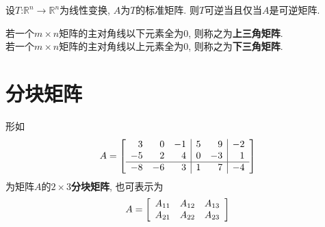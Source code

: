 \begin{TheoremOne}
设$T$:$\mathbb{R}^n\rightarrow\mathbb{R}^n$为线性变换, $A$为$T$的标准矩阵. 则$T$可逆当且仅当$A$是可逆矩阵.
\end{TheoremOne}\vspace{4ex}

若一个$m\times n$矩阵的主对角线以下元素全为0, 则称之为\textbf{上三角矩阵}.\\[1ex]
若一个$m\times n$矩阵的主对角线以上元素全为0, 则称之为\textbf{下三角矩阵}.\\[4ex]

\section{分块矩阵}
形如
\[A=\left[
\begin{array}{r r r|r r|r}
3 & 0 & -1 & 5 & 9 & -2\\
-5 & 2 & 4 & 0 & -3 & 1\\\hline
-8 & -6 & 3 & 1 & 7 & -4
\end{array}
\right]\]
为矩阵$A$的$2\times 3$\textbf{分块矩阵}, 也可表示为
\[A=\left[
\begin{array}{l l l}
A_{11} & A_{12} & A_{13}\\
A_{21} & A_{22} & A_{23}
\end{array}
\right]\]\\[2ex]

